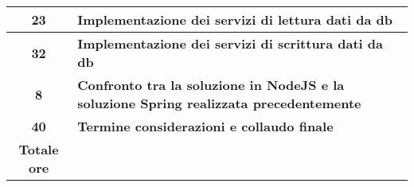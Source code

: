 \begin{tabularx}{\textwidth}{|c|X|}
    \textbf{23} & \textbf{Implementazione dei servizi di lettura dati da db} \\	 
    \hline
    \hline

    \textbf{32} & \textbf{Implementazione dei servizi di scrittura dati da db} \\	 
    \hline
    \textbf{8} & \textbf{Confronto tra la soluzione in NodeJS e la soluzione Spring realizzata precedentemente} \\	 
    \hline
    \hline

    \textbf{40} & \textbf{Termine considerazioni e collaudo finale} \\	 
    \hline
    \hline
    
	
	\textbf{Totale ore} & \multicolumn{1}{|c|}{\textbf{\totaleOre}} \\\hline
	
	
\end{tabularx}